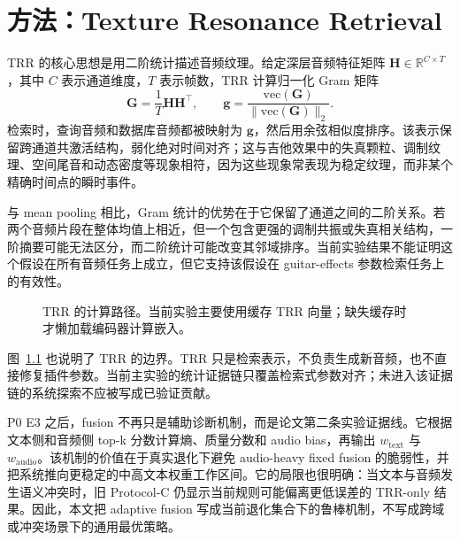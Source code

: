 \chapter{方法：Texture Resonance Retrieval}

TRR 的核心思想是用二阶统计描述音频纹理。给定深层音频特征矩阵 $\mathbf{H}\in\mathbb{R}^{C\times T}$，其中 $C$ 表示通道维度，$T$ 表示帧数，TRR 计算归一化 Gram 矩阵
\[
	\mathbf{G}=\frac{1}{T}\mathbf{H}\mathbf{H}^{\top}, \qquad
	\mathbf{g}=\frac{\mathrm{vec}(\mathbf{G})}{\|\mathrm{vec}(\mathbf{G})\|_2}.
\]
检索时，查询音频和数据库音频都被映射为 $\mathbf{g}$，然后用余弦相似度排序。该表示保留跨通道共激活结构，弱化绝对时间对齐；这与吉他效果中的失真颗粒、调制纹理、空间尾音和动态密度等现象相符，因为这些现象常表现为稳定纹理，而非某个精确时间点的瞬时事件。

与 mean pooling 相比，Gram 统计的优势在于它保留了通道之间的二阶关系。若两个音频片段在整体均值上相近，但一个包含更强的调制共振或失真相关结构，一阶摘要可能无法区分，而二阶统计可能改变其邻域排序。当前实验结果不能证明这个假设在所有音频任务上成立，但它支持该假设在 guitar-effects 参数检索任务上的有效性。

\begin{figure}[H]
	\centering
	\caption{TRR 的计算路径。当前实验主要使用缓存 TRR 向量；缺失缓存时才懒加载编码器计算嵌入。}
	\label{fig:trr-mechanism}
\end{figure}

图~\ref{fig:trr-mechanism} 也说明了 TRR 的边界。TRR 只是检索表示，不负责生成新音频，也不直接修复插件参数。当前主实验的统计证据链只覆盖检索式参数对齐；未进入该证据链的系统探索不应被写成已验证贡献。

P0 E3 之后，fusion 不再只是辅助诊断机制，而是论文第二条实验证据线。它根据文本侧和音频侧 top-k 分数计算熵、质量分数和 audio bias，再输出 $w_{\text{text}}$ 与 $w_{\text{audio}}$。该机制的价值在于真实退化下避免 audio-heavy fixed fusion 的脆弱性，并把系统推向更稳定的中高文本权重工作区间。它的局限也很明确：当文本与音频发生语义冲突时，旧 Protocol-C 仍显示当前规则可能偏离更低误差的 TRR-only 结果。因此，本文把 adaptive fusion 写成当前退化集合下的鲁棒机制，不写成跨域或冲突场景下的通用最优策略。
